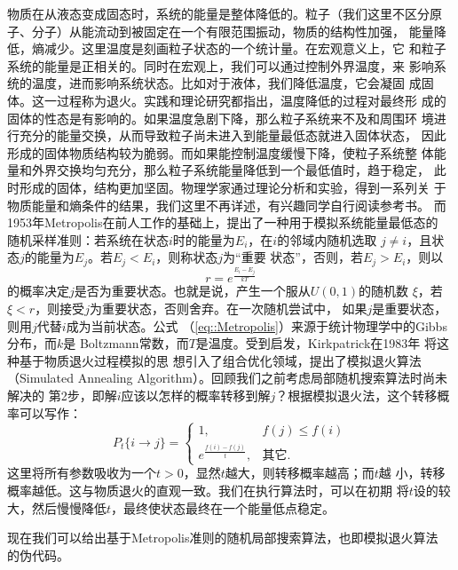 物质在从液态变成固态时，系统的能量是整体降低的。粒子（我们这里不区分原
  子、分子）从能流动到被固定在一个有限范围振动，物质的结构性加强，
能量降低，熵减少。这里温度是刻画粒子状态的一个统计量。在宏观意义上，它
和粒子系统的能量是正相关的。同时在宏观上，我们可以通过控制外界温度，来
影响系统的温度，进而影响系统状态。比如对于液体，我们降低温度，它会凝固
成固体。这一过程称为退火。实践和理论研究都指出，温度降低的过程对最终形
成的固体的性态是有影响的。如果温度急剧下降，那么粒子系统来不及和周围环
境进行充分的能量交换，从而导致粒子尚未进入到能量最低态就进入固体状态，
因此形成的固体物质结构较为脆弱。而如果能控制温度缓慢下降，使粒子系统整
体能量和外界交换均匀充分，那么粒子系统能量降低到一个最低值时，趋于稳定，
此时形成的固体，结构更加坚固。物理学家通过理论分析和实验，得到一系列关
于物质能量和熵条件的结果，我们这里不再详述，有兴趣同学自行阅读参考书。
而1953年Metropolis在前人工作的基础上，提出了一种用于模拟系统能量最低态的
随机采样准则：若系统在状态$i$时的能量为$E_i$，在$i$的邻域内随机选取
$j\neq i$，且状态$j$的能量为$E_j$。若$E_j < E_i$，则称状态$j$为“重要
状态”，否则，若$E_j > E_i$，则以
\begin{equation}
  r = e^{\frac{E_i - E_j}{kT}}
  \label{eq::Metropolis}
\end{equation}
的概率决定$j$是否为重要状态。也就是说，产生一个服从$U(0, 1)$的随机数
$\xi$，若$\xi < r$，则接受$j$为重要状态，否则舍弃。在一次随机尝试中，
如果$j$是重要状态，则用$j$代替$i$成为当前状态。公式
（\ref{eq::Metropolis}）来源于统计物理学中的Gibbs分布，而$k$是
Boltzmann常数，而$T$是温度。受到启发，Kirkpatrick在1983年
\cite{KirkpatrickGelattVecchi83}将这种基于物质退火过程模拟的思
想引入了组合优化领域，提出了模拟退火算法（Simulated
  Annealing Algorithm）。回顾我们之前考虑局部随机搜索算法时尚未解决的
第2步，即解$i$应该以怎样的概率转移到解$j$？根据模拟退火法，这个转移概
率可以写作：
\begin{equation}
  P_t\{i \to j\} = \left\{
  \begin{array}{ll}
    1, & f(j) \leq f(i)\\
    e^{\frac{f(i) - f(j)}{t}}, &\mbox{其它}.
  \end{array}
  \right.
  \label{eq::SAA_metro}
\end{equation}
这里将所有参数吸收为一个$t > 0$，显然$t$越大，则转移概率越高；而$t$越
小，转移概率越低。这与物质退火的直观一致。我们在执行算法时，可以在初期
将$t$设的较大，然后慢慢降低$t$，最终使状态最终在一个能量低点稳定。

现在我们可以给出基于Metropolis准则的随机局部搜索算法，也即模拟退火算法
的伪代码。

